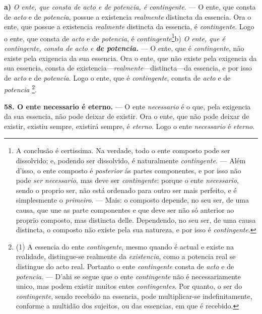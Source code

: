 \textbf{a)} \emph{O ente, que consta de acto e de potencia, é contingente.} --- O ente, que consta de \emph{acto} e de \emph{potencia}, possue a existencia \emph{realmente} distincta da essencia. Ora o ente, que possue a existencia \emph{realmente} distincta da essencia, é \emph{contingente}. Logo o ente, que consta de \emph{acto} e de \emph{potencia}, é \emph{contingente}\footnote{A conclusão é certissima. Na verdade, todo o ente composto pode ser dissolvido; e, podendo ser dissolvido, é naturalmente \emph{contingente}. --- Além d'isso, o ente composto é \emph{posterior} ás partes componentes, e por isso não pode \emph{ser necessario}, mas deve ser \emph{contingente}: porque o ente \emph{necessario}, sendo o proprio ser, não está ordenado para outro ser mais perfeito, e é simplesmente o \emph{primeiro}. --- Mais: o composto depende, no seu ser, de uma causa, que une as parte componentes e que deve ser não só anterior ao proprio composto, mas distincta delle. Dependendo, no seu ser, de uma causa distincta, o composto não existe pela sua natureza, e por isso é \emph{contingente}.}b) \emph{O ente, que é contingente, consta de acto e} \textbf{\emph{de potencia.}} — O ente, que é \emph{contingente}, não existe pela exigencia da sua essencia. Ora o ente, que não existe pela exigencia da sua essencia, consta de existencia—\emph{realmente}—distincta—da essencia, e por isso de \emph{acto} e de \emph{potencia}. Logo o ente, que é \emph{contingente}, consta de \emph{acto} e de \emph{potencia} \footnote{(1) A essencia do ente \emph{contingente}, mesmo quando é actual e existe na realidade, distingue-se realmente da \emph{existencia}, como a potencia real se distingue do acto real. Portanto o ente \emph{contingente} consta de \emph{acto} e de \emph{potencia}. — D'ahi se segue que o ente \emph{contingente} não é necessariamente unico, mas podem existir muitos entes \emph{contingentes}. Por quanto, o ser do \emph{contingente}, sendo recebido na essencia, pode multiplicar-se indefinitamente, conforme a multidão dos sujeitos, ou das essencias, em que é recebido.}.

\textbf{58. O ente necessario é eterno.} — O ente \emph{necessario} é o que, pela exigencia da sua essencia, não pode deixar de existir. Ora o ente, que não pode deixar de existir, existiu sempre, existirá sempre, é \emph{eterno}. Logo o ente \emph{necessario} é \emph{eterno}.

